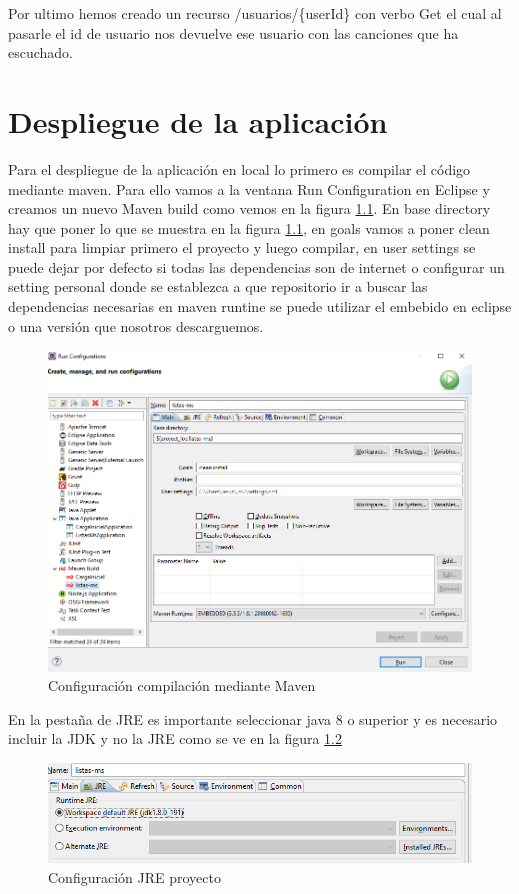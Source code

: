 \documentclass[12pt]{report} %
\begin{document}
Por ultimo hemos creado un recurso /usuarios/\{userId\} con verbo Get el cual al pasarle el id de usuario nos devuelve ese usuario con las canciones que ha escuchado.

\chapter{Despliegue de la aplicación}

Para el despliegue de la aplicación en local lo primero es compilar el código mediante maven. Para ello vamos a la ventana Run Configuration en Eclipse y creamos un nuevo Maven build como vemos en la figura \ref{fig:cleaninstallmaven}. En base directory hay que poner lo que se muestra en la figura \ref{fig:cleaninstallmaven},  en goals vamos a poner clean install para limpiar primero el proyecto y luego compilar, en user settings se puede dejar por defecto si todas las dependencias son de internet o configurar un setting personal donde se establezca a que repositorio ir a buscar las dependencias necesarias en maven runtine se puede utilizar el embebido en eclipse o una versión que nosotros descarguemos.

\begin{figure}
	\centering
	\includegraphics[width=0.7\linewidth]{imagenes/cleanInstallMAven}
	\caption{Configuración compilación mediante Maven}
	\label{fig:cleaninstallmaven}
\end{figure}

En la pestaña de JRE es importante seleccionar java 8 o superior y es necesario incluir la JDK y no la JRE como se ve en la figura \ref{fig:jremaven}

\begin{figure}
	\centering
	\includegraphics[width=0.7\linewidth]{imagenes/jreMaven}
	\caption{Configuración JRE proyecto}
	\label{fig:jremaven}
\end{figure}
\end{document}
